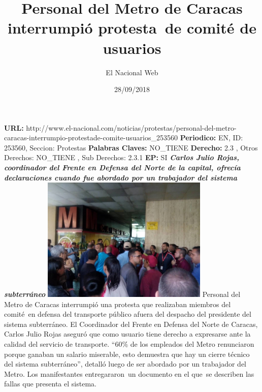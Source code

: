 \documentclass{article}%
\title{\textbf{Personal del Metro de Caracas interrumpió protesta~de comité de usuarios}}%
\author{El Nacional Web}%
\date{28/09/2018}%
\begin{document}
%
\normalsize%
\maketitle%
\textbf{URL: }%
http://www.el{-}nacional.com/noticias/protestas/personal{-}del{-}metro{-}caracas{-}interrumpio{-}protestade{-}comite{-}usuarios\_253560\newline%
%
\textbf{Periodico: }%
EN, %
ID: %
253560, %
Seccion: %
Protestas\newline%
%
\textbf{Palabras Claves: }%
NO\_TIENE\newline%
%
\textbf{Derecho: }%
2.3%
, Otros Derechos: %
NO\_TIENE%
, Sub Derechos: %
2.3.1%
\newline%
%
\textbf{EP: }%
SI\newline%
\newline%
%
\textbf{\textit{Carlos Julio Rojas, coordinador del Frente en Defensa del Norte de la capital, ofrecía declaraciones cuando fue abordado por un trabajador del sistema subterráneo}}%
\newline%
\newline%
%
\includegraphics[width=300px]{49.jpg}%
\newline%
%
Personal del Metro de Caracas interrumpió una protesta que realizaban miembros del comité~en defensa del transporte público afuera del despacho del presidente del sistema subterráneo.%
\newline%
%
El Coordinador del Frente en Defensa del Norte de Caracas, Carlos Julio Rojas aseguró que como usuario tiene derecho a expresarse ante la calidad del servicio de transporte.%
\newline%
%
“60\% de los empleados del Metro renunciaron porque ganaban un salario miserable, esto demuestra que hay un cierre técnico del sistema subterráneo”, detalló luego de ser abordado por un trabajador del Metro.%
\newline%
%
Los manifestantes entregararon~un documento en el que~se describen las fallas que presenta el sistema.%
\newline%
%
\end{document}
